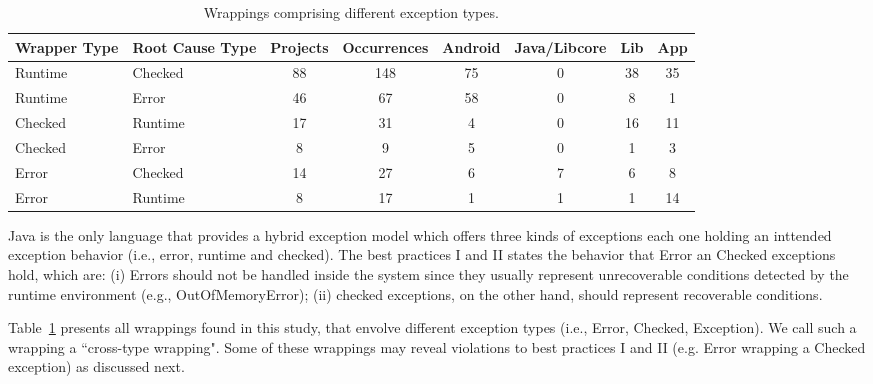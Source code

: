 \documentclass[conference]{IEEEtran}
\begin{document}
\begin{table}
  \centering
  \begin{tabular}{llcccccc}
    \hline
    \bfseries{Wrapper Type}  &  \bfseries{Root Cause Type} &  \bfseries{Projects}  &  \bfseries{Occurrences} & \textsf{Android} & \textsf{Java/Libcore} & \textsf{Lib} & \textsf{App}  \\
    \hline
      
      Runtime &  Checked   & 88 & 148 &  75  &  0   & 38 &  35 \\
      Runtime   &  Error   & 46  &  67    &  58  &  0   & 8  &  1   \\      
      Checked &  Runtime   & 17  & 31 & 4 &  0  & 16 &  11 \\
      Checked & Error      & 8 &  9  & 5  &  0  &  1 &  3  \\
      Error & Checked      & 14 &  27 &  6  &  7  &  6 &   8    \\
      Error & Runtime     & 8  &  17   & 1 &  1  & 1 &  14    \\

  \hline
  \end{tabular}
\caption{Wrappings comprising different exception types.}
\label{tab:wrappingandroid}
\end{table}
Java is the only language that provides a hybrid exception model 
which offers three kinds of exceptions each one holding an inttended exception behavior (i.e., error, 
runtime and checked). The best practices I and II states the behavior that Error an Checked exceptions hold, which are: 
(i) Errors should not be handled inside the system since they usually represent unrecoverable conditions detected 
by the runtime environment (e.g.,  OutOfMemoryError); (ii) checked exceptions, on the other hand, should represent recoverable conditions. 

Table~\ref{tab:wrappingandroid} presents all wrappings found in this study, that
envolve different exception types (i.e., Error, Checked, Exception). We call 
such a wrapping a ``cross-type wrapping".  Some of these wrappings may reveal 
violations to best practices I and II (e.g. Error wrapping a Checked exception) as discussed next.
\end{document}
